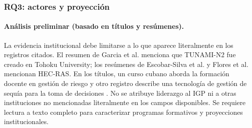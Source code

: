 \documentclass[12pt,a4paper]{article}
\begin{document}
\subsubsection{RQ3: actores y proyección}
\label{sec:rq3}
\paragraph*{Análisis preliminar (basado en títulos y resúmenes).}
La evidencia institucional debe limitarse a lo que aparece literalmente en los registros citados. El resumen de Garcia et al. menciona que TUNAMI-N2 fue creado en Tohoku University; los resúmenes de Escobar-Silva et al. y Flores et al. mencionan HEC-RAS. En los títulos, un curso cubano aborda la formación docente en gestión de riesgo y otro registro describe una tecnología de gestión de sequía para la toma de decisiones \parencite{garcia2025parallel, escobarsilva2023assessing, flores2026numerical, lengonzlez2022curso, varelaledesma2021tecnolog}. No se atribuye liderazgo al IGP ni a otras instituciones no mencionadas literalmente en los campos disponibles. Se requiere lectura a texto completo para caracterizar programas formativos y proyecciones institucionales.

\end{document}
